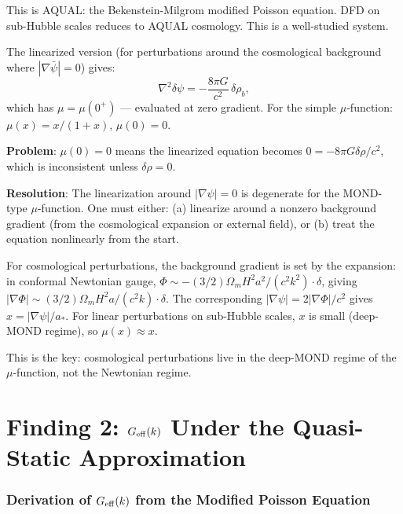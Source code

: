 \documentclass[11pt]{article}
\newcommand{\dpsi}{\delta\psi}
\newcommand{\astar}{a_*}
\begin{document}
This is AQUAL: the Bekenstein-Milgrom modified Poisson equation.
DFD on sub-Hubble scales reduces to AQUAL cosmology. This is a
well-studied system.

The linearized version (for perturbations around the cosmological
background where $|\nabla\bar\psi| = 0$) gives:
\begin{equation}
\nabla^2\dpsi = -\frac{8\pi G}{c^2}\,\delta\rho_b,
\end{equation}
which has $\mu = \mu(0^+)$ --- evaluated at zero gradient. For the
simple $\mu$-function: $\mu(x) = x/(1+x)$, $\mu(0) = 0$.

\textbf{Problem}: $\mu(0) = 0$ means the linearized equation becomes
$0 = -8\pi G\delta\rho/c^2$, which is inconsistent unless $\delta\rho = 0$.

\textbf{Resolution}: The linearization around $|\nabla\psi| = 0$ is
degenerate for the MOND-type $\mu$-function. One must either:
(a) linearize around a nonzero background gradient (from the
cosmological expansion or external field), or
(b) treat the equation nonlinearly from the start.

For cosmological perturbations, the background gradient is set by
the expansion: in conformal Newtonian gauge, $\Phi \sim -(3/2)\Omega_m H^2 a^2/(c^2 k^2) \cdot \delta$,
giving $|\nabla\Phi| \sim (3/2)\Omega_m H^2 a / (c^2 k) \cdot \delta$.
The corresponding $|\nabla\psi| = 2|\nabla\Phi|/c^2$ gives
$x = |\nabla\psi|/\astar$. For linear perturbations on sub-Hubble
scales, $x$ is small (deep-MOND regime), so $\mu(x) \approx x$.

This is the key: cosmological perturbations live in the deep-MOND
regime of the $\mu$-function, not the Newtonian regime.


\part{Finding 2: $G_{\rm eff}(k)$ Under the Quasi-Static Approximation}
\label{part:Geff}

\section{Derivation of $G_{\rm eff}(k)$ from the Modified Poisson Equation}
\end{document}
